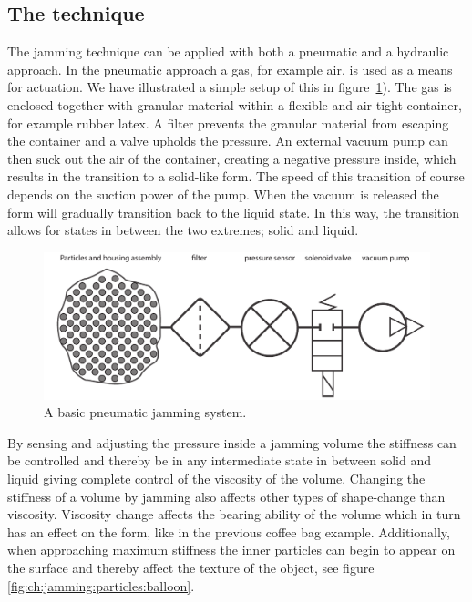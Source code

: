 \subsection{The technique}
\label{ch:jamming:technique}

The jamming technique can be applied with both a pneumatic and a hydraulic approach.
In the pneumatic approach a gas, for example air, is used as a means for actuation. 
We have illustrated a simple setup of this in figure~\ref{fig:ch:jamming:jamming-basics}).
The gas is enclosed together with granular material within a flexible and air tight container, for example rubber latex. 
A filter prevents the granular material from escaping the container and a valve upholds the pressure.
An external vacuum pump can then suck out the air of the container, creating a negative pressure inside, which results in the transition to a solid-like form. 
The speed of this transition of course depends on the suction power of the pump.
When the vacuum is released the form will gradually transition back to the liquid state. 
In this way, the transition allows for states in between the two extremes; solid and liquid.

\begin{figure}[h]
  \centering
  \includegraphics[width=.9\textwidth]{figures/jamming/jamming-basics.pdf}
  \caption{A basic pneumatic jamming system.}
  \label{fig:ch:jamming:jamming-basics}
\end{figure}

By sensing and adjusting the pressure inside a jamming volume the stiffness can be controlled and thereby be in any intermediate state in between solid and liquid giving complete control of the viscosity of the volume.
Changing the stiffness of a volume by jamming also affects other types of shape-change than viscosity.
Viscosity change affects the bearing ability of the volume which in turn has an effect on the form, like in the previous coffee bag example.
Additionally, when approaching maximum stiffness the inner particles can begin to appear on the surface and thereby affect the texture of the object, see figure \ref{fig:ch:jamming:particles:balloon}.

